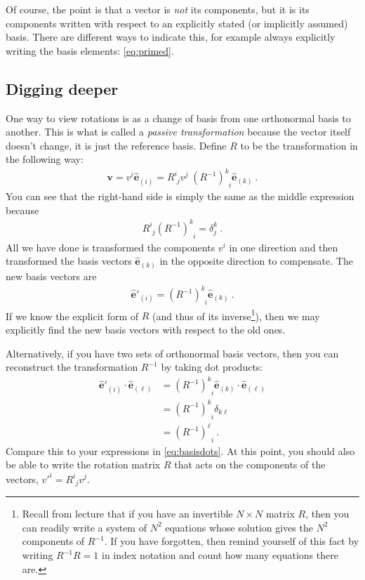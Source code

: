 \documentclass[12pt]{article}
\numberwithin{equation}{section}    %
\renewcommand{\vec}[1]{\mathbf{#1}} %
\begin{document}
Of course, the point is that a vector is \emph{not} its components, but it is its components written with respect to an explicitly stated (or implicitly assumed) basis. There are different ways to indicate this, for example always explicitly writing the basis elements: \eqref{eq:primed}. 


\subsection*{Digging deeper}

One way to view rotations is as a change of basis from one orthonormal basis to another. This is what is called a \emph{passive transformation} because the vector itself doesn't change, it is just the reference basis. Define $R$ to be the transformation in the following way:
\begin{align}
	\vec{v} = v^i \hat{\vec{e}}_{(i)} = 
	R^i_{\phantom{i}j}v^j
	\;
	(R^{-1})^k_{\phantom{k}i}
	\hat{\vec{e}}_{(k)} \ .
\end{align}
You can see that the right-hand side is simply the same as the middle expression because
\begin{align}
	R^i_{\phantom{i}j} (R^{-1})^k_{\phantom{k}i} = \delta^k_j \ .
\end{align}
All we have done is transformed the components $v^i$ in one direction and then transformed the basis vectors $\hat{\vec{e}}_{(k)}$ in the opposite direction to compensate. The new basis vectors are
\begin{align}
	\hat{\vec{e}}'_{(i)} = (R^{-1})^k_{\phantom{k}i}
	\hat{\vec{e}}_{(k)} \ .
\end{align}
If we know the explicit form of $R$ (and thus of its inverse\footnote{Recall from lecture that if you have an invertible $N\times N$ matrix $R$, then you can readily write a system of $N^2$ equations whose solution gives the $N^2$ components of $R^{-1}$. If you have forgotten, then remind yourself of this fact by writing $R^{-1}R = 1$ in index notation and count how many equations there are.}), then we may explicitly find the new basis vectors with respect to the old ones.

Alternatively, if you have two sets of orthonormal basis vectors, then you can reconstruct the transformation $R^{-1}$ by taking dot products:
\begin{align}
	\hat{\vec{e}}'_{(i)}\cdot  
	\hat{\vec{e}}_{(\ell)}
	&= (R^{-1})^k_{\phantom{k}i}
	\hat{\vec{e}}_{(k)} 
	\cdot  
	\hat{\vec{e}}_{(\ell)}
	\\&=
	(R^{-1})^k_{\phantom{k}i}
	\delta_{k\ell}
	\\&=
	(R^{-1})^\ell_{\phantom{k}i}
	\ .
\end{align}
Compare this to your expressions in \eqref{eq:basisdots}. At this point, you should also be able to write the rotation matrix $R$ that acts on the components of the vectors, $v'^i = R^i_{\phantom{i}j}v^j$. 





\end{document}
